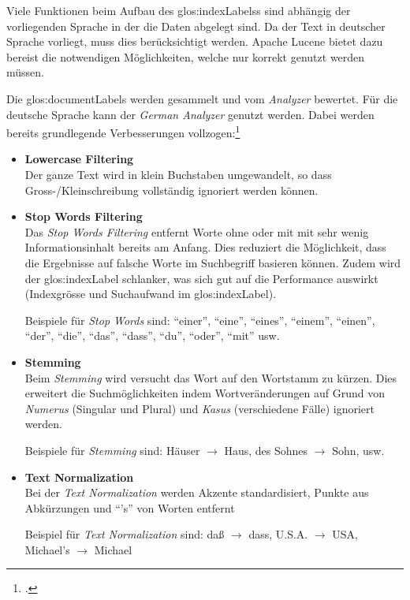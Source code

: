 Viele Funktionen beim Aufbau des \glspl{glos:indexLabel}s sind abhängig der vorliegenden Sprache in der die Daten abgelegt sind.
Da der Text in deutscher Sprache vorliegt, muss dies berücksichtigt werden.
Apache Lucene bietet dazu bereist die notwendigen Möglichkeiten, welche nur korrekt genutzt werden müssen.

Die \glspl{glos:documentLabel} werden gesammelt und vom \textit{Analyzer} bewertet. Für die deutsche Sprache kann der \textit{German Analyzer} genutzt werden.
Dabei werden bereits grundlegende Verbesserungen vollzogen:\footcite{Inner_workings_of_the_German_Analyzer_in_Lucene_2016-05-08}
\begin{itemize}
	\item \textbf{Lowercase Filtering}\\
	Der ganze Text wird in klein Buchstaben umgewandelt, so dass Gross-/Kleinschreibung vollständig ignoriert werden können.

	\item \textbf{Stop Words Filtering}\\
	Das \textit{Stop Words Filtering} entfernt Worte ohne oder mit mit sehr wenig Informationsinhalt bereits am Anfang.
	Dies reduziert die Möglichkeit, dass die Ergebnisse auf falsche Worte im Suchbegriff basieren können.
	Zudem wird der \gls{glos:indexLabel} schlanker, was sich gut auf die Performance auswirkt (Indexgrösse und Suchaufwand im \gls{glos:indexLabel}).

	Beispiele für \textit{Stop Words} sind:
	"`einer"', "`eine"', "`eines"', "`einem"', "`einen"', "`der"', "`die"', "`das"', "`dass"', "`du"', "`oder"', "`mit"' usw.

	\item \textbf{Stemming}\\
	Beim \textit{Stemming} wird versucht das Wort auf den Wortstamm zu kürzen.
	Dies erweitert die Suchmöglichkeiten indem Wortveränderungen auf Grund von \textit{Numerus} (Singular und Plural) und \textit{Kasus} (verschiedene Fälle) ignoriert werden.

	Beispiele für \textit{Stemming} sind:
	Häuser $\rightarrow$ Haus, des Sohnes $\rightarrow$ Sohn, usw.

	\item \textbf{Text Normalization}\\
	Bei der \textit{Text Normalization} werden Akzente standardisiert, Punkte aus Abkürzungen und "`'s"' von Worten entfernt

	Beispiel für \textit{Text Normalization} sind:
	daß $\rightarrow$ dass, U.S.A. $\rightarrow$ USA, Michael's $\rightarrow$ Michael

\end{itemize}


